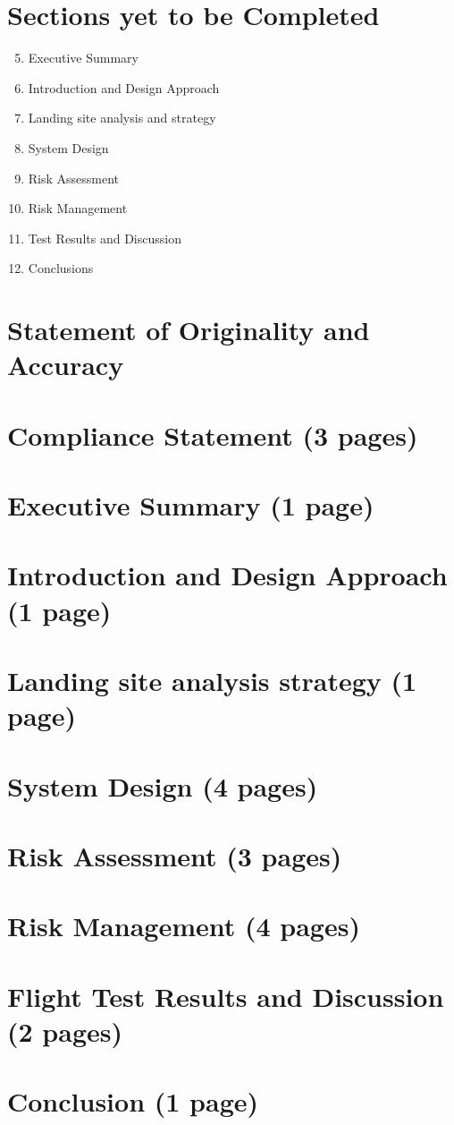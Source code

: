 \documentclass{article}
\begin{document}
\section{Sections yet to be Completed}
\begin{enumerate}
	\setcounter{enumi}{4}
	\item Executive Summary
	\item Introduction and Design Approach
	\item Landing site analysis and strategy
	\item System Design
	\item Risk Assessment
	\item Risk Management
	\item Test Results and Discussion
	\item Conclusions
\end{enumerate}

\newpage

\section{Statement of Originality and Accuracy}


\newpage

\section{Compliance Statement (3 pages)}


\section{Executive Summary (1 page)}


\section{Introduction and Design Approach (1 page)}


\section{Landing site analysis strategy (1 page)}


\section{System Design (4 pages)}


\section{Risk Assessment (3 pages)}


\section{Risk Management (4 pages)}


\section{Flight Test Results and Discussion (2 pages)}


\section{Conclusion (1 page)}

\end{document}
